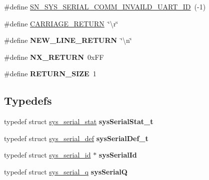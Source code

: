 \begin{DoxyCompactItemize}
\item 
\#define \hyperlink{group__SYSTEM__SERIAL__COMM_gab3cb3e808e6aa6d23c73d7687b3b937e}{S\+N\+\_\+\+S\+Y\+S\+\_\+\+S\+E\+R\+I\+A\+L\+\_\+\+C\+O\+M\+M\+\_\+\+I\+N\+V\+A\+I\+L\+D\+\_\+\+U\+A\+R\+T\+\_\+\+ID}~(-\/1)
\item 
\#define \hyperlink{group__SYSTEM__SERIAL__COMM_ga3b81478c7058ceb6ed610ce8e2ca3822}{C\+A\+R\+R\+I\+A\+G\+E\+\_\+\+R\+E\+T\+U\+RN}~\char`\"{}\textbackslash{}r\char`\"{}
\item 
\mbox{\label{group__SYSTEM__SERIAL__COMM_ga501b77360464523474ef3fd6076599d5}} 
\#define {\bfseries N\+E\+W\+\_\+\+L\+I\+N\+E\+\_\+\+R\+E\+T\+U\+RN}~\char`\"{}\textbackslash{}n\char`\"{}
\item 
\mbox{\label{group__SYSTEM__SERIAL__COMM_gaab38bc7c033c5c8a5443736e6adf31ec}} 
\#define {\bfseries N\+X\+\_\+\+R\+E\+T\+U\+RN}~0x\+FF
\item 
\mbox{\label{group__SYSTEM__SERIAL__COMM_ga5a476228d4333eaa5eb9148399655d60}} 
\#define {\bfseries R\+E\+T\+U\+R\+N\+\_\+\+S\+I\+ZE}~1
\end{DoxyCompactItemize}
\subsection*{Typedefs}
\begin{DoxyCompactItemize}
\item 
\mbox{\label{group__SYSTEM__SERIAL__COMM_gae2b8f8d40db50a365f1d32cdfd539428}} 
typedef struct \hyperlink{structsys__serial__stat}{sys\+\_\+serial\+\_\+stat} {\bfseries sys\+Serial\+Stat\+\_\+t}
\item 
\mbox{\label{group__SYSTEM__SERIAL__COMM_gaa97ac9544ab815d09f1153c2715bee92}} 
typedef struct \hyperlink{structsys__serial__def}{sys\+\_\+serial\+\_\+def} {\bfseries sys\+Serial\+Def\+\_\+t}
\item 
\mbox{\label{group__SYSTEM__SERIAL__COMM_ga3fa14f9fe3f2c72c4889c51df638e51d}} 
typedef struct \hyperlink{structsys__serial__id}{sys\+\_\+serial\+\_\+id} $\ast$ {\bfseries sys\+Serial\+Id}
\item 
\mbox{\label{group__SYSTEM__SERIAL__COMM_gaa194b6d4fd7457e2ecc053387b0d15fd}} 
typedef struct \hyperlink{structsys__serial__q}{sys\+\_\+serial\+\_\+q} {\bfseries sys\+SerialQ}
\end{DoxyCompactItemize}
